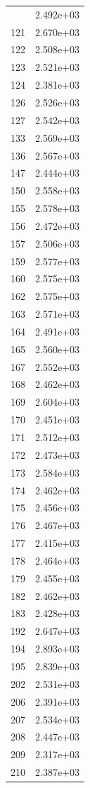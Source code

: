 \documentclass[12pt]{article}
\begin{document}
\begin{longtable}{@{}cc@{}}
\bottomrule
\endlastfoot
120 & 2.492e+03 \\
121 & 2.670e+03 \\
122 & 2.508e+03 \\
123 & 2.521e+03 \\
124 & 2.381e+03 \\
126 & 2.526e+03 \\
127 & 2.542e+03 \\
133 & 2.569e+03 \\
136 & 2.567e+03 \\
147 & 2.444e+03 \\
150 & 2.558e+03 \\
155 & 2.578e+03 \\
156 & 2.472e+03 \\
157 & 2.506e+03 \\
159 & 2.577e+03 \\
160 & 2.575e+03 \\
162 & 2.575e+03 \\
163 & 2.571e+03 \\
164 & 2.491e+03 \\
165 & 2.560e+03 \\
167 & 2.552e+03 \\
168 & 2.462e+03 \\
169 & 2.604e+03 \\
170 & 2.451e+03 \\
171 & 2.512e+03 \\
172 & 2.473e+03 \\
173 & 2.584e+03 \\
174 & 2.462e+03 \\
175 & 2.456e+03 \\
176 & 2.467e+03 \\
177 & 2.415e+03 \\
178 & 2.464e+03 \\
179 & 2.455e+03 \\
182 & 2.462e+03 \\
183 & 2.428e+03 \\
192 & 2.647e+03 \\
194 & 2.893e+03 \\
195 & 2.839e+03 \\
202 & 2.531e+03 \\
206 & 2.391e+03 \\
207 & 2.534e+03 \\
208 & 2.447e+03 \\
209 & 2.317e+03 \\
210 & 2.387e+03 \\

\end{longtable}
\end{document}
